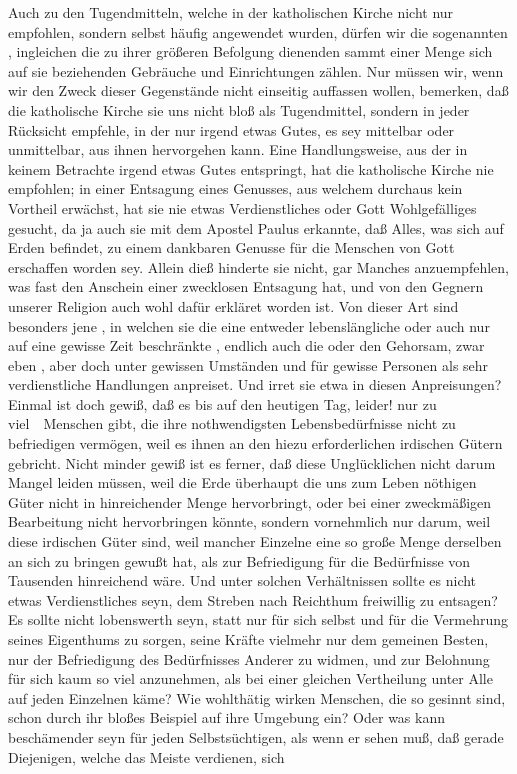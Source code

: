 \begin{RWanm} 
Auch zu den Tugendmitteln, welche in der katholischen Kirche nicht nur empfohlen, sondern selbst häufig angewendet wurden, dürfen wir die sogenannten , ingleichen die zu ihrer größeren Befolgung dienenden  sammt einer Menge sich auf sie beziehenden Gebräuche und Einrichtungen zählen. Nur müssen wir, wenn wir den Zweck dieser Gegenstände nicht einseitig auffassen wollen, bemerken, daß die katholische Kirche sie uns nicht bloß als Tugendmittel, sondern in jeder Rücksicht empfehle, in der nur irgend etwas Gutes, es sey mittelbar oder unmittelbar, aus ihnen hervorgehen kann. Eine Handlungsweise, aus der in keinem Betrachte irgend etwas Gutes entspringt, hat die katholische Kirche nie empfohlen; in einer Entsagung eines Genusses, aus welchem durchaus kein Vortheil erwächst, hat sie nie etwas Verdienstliches oder Gott Wohlgefälliges gesucht, da ja auch sie mit dem Apostel Paulus erkannte, daß Alles, was sich auf Erden befindet, zu einem dankbaren Genusse für die Menschen von Gott erschaffen worden sey. Allein dieß hinderte sie nicht, gar Manches anzuempfehlen, was fast den Anschein einer zwecklosen Entsagung hat, und von den Gegnern unserer Religion auch wohl dafür erkläret worden ist. Von dieser Art sind besonders jene , in welchen sie die  eine entweder lebenslängliche oder auch nur auf eine gewisse Zeit beschränkte , endlich auch die  oder den Gehorsam, zwar eben , aber doch unter gewissen Umständen und für gewisse Personen als sehr verdienstliche Handlungen anpreiset. Und irret sie etwa in diesen Anpreisungen? Einmal ist doch gewiß, daß es bis auf den heutigen Tag, leider! nur zu viel~\ Menschen gibt, die ihre nothwendigsten Lebensbedürfnisse nicht zu befriedigen vermögen, weil es ihnen an den hiezu erforderlichen irdischen Gütern gebricht. Nicht minder gewiß ist es ferner, daß diese Unglücklichen nicht darum Mangel leiden müssen, weil die Erde überhaupt die uns zum Leben nöthigen Güter nicht in hinreichender Menge hervorbringt, oder bei einer zweckmäßigen Bearbeitung nicht hervorbringen könnte, sondern vornehmlich nur darum, weil diese irdischen Güter  sind, weil mancher Einzelne eine so große Menge derselben an sich zu bringen gewußt hat, als zur Befriedigung für die Bedürfnisse von Tausenden hinreichend wäre. Und unter solchen Verhältnissen sollte es nicht etwas Verdienstliches seyn, dem Streben nach Reichthum freiwillig zu entsagen? Es sollte nicht lobenswerth seyn, statt nur für sich selbst und für die Vermehrung seines Eigenthums zu sorgen, seine Kräfte vielmehr nur dem gemeinen Besten, nur der Befriedigung des Bedürfnisses Anderer zu widmen, und zur Belohnung für sich kaum so viel anzunehmen, als bei einer gleichen Vertheilung unter Alle auf jeden Einzelnen käme? Wie wohlthätig wirken Menschen, die so gesinnt sind, schon durch ihr bloßes Beispiel auf ihre Umgebung ein? Oder was kann beschämender seyn für jeden Selbstsüchtigen, als wenn er sehen muß, daß gerade Diejenigen, welche das Meiste verdienen, sich 
\end{RWanm}
